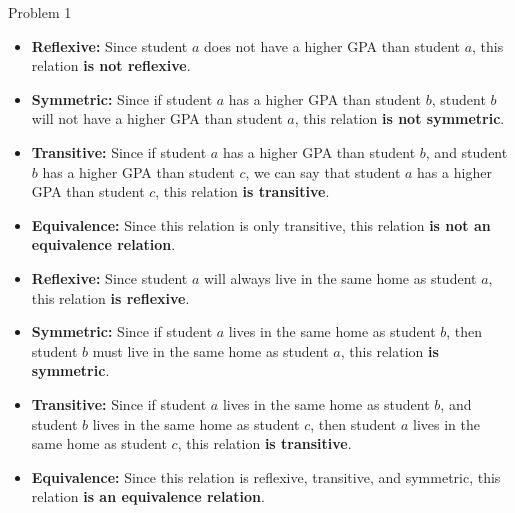 \begin{problem}{Problem 1}
    \begin{Highlight}
        \begin{itemize}
            \item \textbf{Reflexive:} Since student $a$ does not have a higher GPA than student $a$, this relation \textbf{is not reflexive}.
            \item \textbf{Symmetric:} Since if student $a$ has a higher GPA than student $b$, student $b$ will not have a higher GPA than student $a$, this relation \textbf{is not symmetric}.
            \item \textbf{Transitive:} Since if student $a$ has a higher GPA than student $b$, and student $b$ has a higher GPA than student $c$, we can say that student $a$ has a higher GPA than student
            $c$, this relation \textbf{is transitive}.
            \item \textbf{Equivalence:} Since this relation is only transitive, this relation \textbf{is not an equivalence relation}.
        \end{itemize}
    \end{Highlight}

    \begin{Highlight}
        \begin{itemize}
            \item \textbf{Reflexive:} Since student $a$ will always live in the same home as student $a$, this relation \textbf{is reflexive}.
            \item \textbf{Symmetric:} Since if student $a$ lives in the same home as student $b$, then student $b$ must live in the same home as student $a$, this relation \textbf{is symmetric}.
            \item \textbf{Transitive:} Since if student $a$ lives in the same home as student $b$, and student $b$ lives in the same home as student $c$, then student $a$ lives in the same home as
            student $c$, this relation \textbf{is transitive}.
            \item \textbf{Equivalence:} Since this relation is reflexive, transitive, and symmetric, this relation \textbf{is an equivalence relation}.
        \end{itemize}
    \end{Highlight}
\end{problem}

